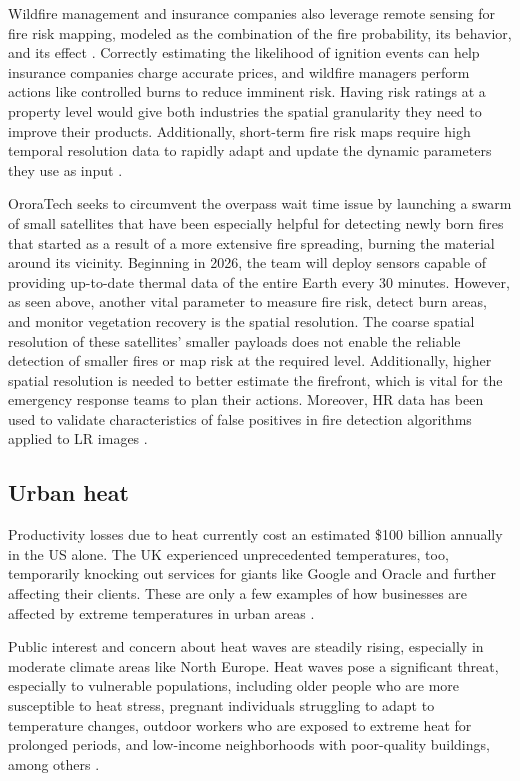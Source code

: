     Wildfire management and insurance companies also leverage remote sensing for fire risk mapping, modeled as the combination of the fire probability, its behavior, and its effect \cite{crichton99}. Correctly estimating the likelihood of ignition events can help insurance companies charge accurate prices, and wildfire managers perform actions like controlled burns to reduce imminent risk. 
    Having risk ratings at a property level would give both industries the spatial granularity they need to improve their products. Additionally, short-term fire risk maps require high temporal resolution data to rapidly adapt and update the dynamic parameters they use as input \cite{rs11222638}.


    OroraTech seeks to circumvent the overpass wait time issue by launching a swarm of small satellites that have been especially helpful for detecting newly born fires that started as a result of a more extensive fire spreading, burning the material around its vicinity. Beginning in 2026,  the team will deploy sensors capable of providing up-to-date thermal data of the entire Earth every 30 minutes. However, as seen above, another vital parameter to measure fire risk, detect burn areas, and monitor vegetation recovery is the spatial resolution. The coarse spatial resolution of these satellites' smaller payloads does not enable the reliable detection of smaller fires or map risk at the required level. Additionally, higher spatial resolution is needed to better estimate the firefront, which is vital for the emergency response teams to plan their actions.
    Moreover, HR data has been used to validate characteristics of false positives in fire detection algorithms applied to LR images \cite{ijgi11120601}. 

    \subsection{Urban heat}

    Productivity losses due to heat currently cost an estimated \$100 billion annually in the US alone.
    The UK experienced unprecedented temperatures, too, temporarily knocking out services for giants like Google and Oracle and further affecting their clients.
    These are only a few examples of how businesses are affected by extreme temperatures in urban areas \cite{atlanticcouncil2021extreme}.  

    Public interest and concern about heat waves are steadily rising, especially in moderate climate areas like North Europe. Heat waves pose a significant threat, especially to vulnerable populations, including older people who are more susceptible to heat stress, pregnant individuals struggling to adapt to temperature changes, outdoor workers who are exposed to extreme heat for prolonged periods, and low-income neighborhoods with poor-quality buildings, among others \cite{Hsu2021Disproportionate}.   

